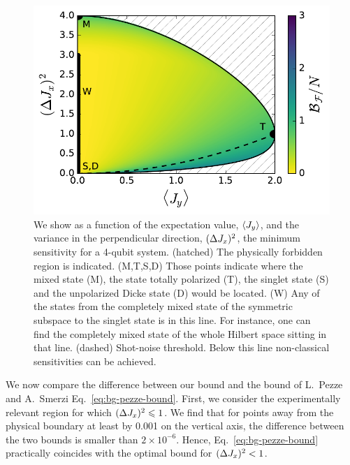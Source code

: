 \begin{figure}[htp]
  \centering
  \includegraphics[scale=.65]{img/LT_spsq2d_4.pdf}
  \caption[Solution for 4 particle on the paramenter region for spin-squeezed states.]{We show as a function of the expectation value, $\langle{J_y}\rangle$, and the variance in the perpendicular direction, $(\Delta J_x )^2$, the minimum sensitivity for a 4-qubit system.
  (hatched) The physically forbidden region is indicated. (M,T,S,D) Those points indicate where the mixed state (M), the state totally polarized (T), the singlet state (S) and the unpolarized Dicke state (D) would be located. (W) Any of the states from the completely mixed state of the symmetric subspace to the singlet state is in this line. For instance, one can  find the completely mixed state of the whole Hilbert space sitting in that line. (dashed) Shot-noise threshold. Below this line non-classical sensitivities can be achieved.}
  \label{fig:lt-spsq2d-4}
\end{figure}

We now compare the difference between our bound and the bound of L.~Pezze and A.~Smerzi Eq.~\eqref{eq:bg-pezze-bound}.
First, we consider the experimentally relevant region for which $(\Delta J_x )^2\leqslant 1$.
We find that for points away from the physical boundary at least by 0.001 on the vertical axis, the difference between the two bounds is smaller than $2\times10^{-6}$.
Hence, Eq.~\eqref{eq:bg-pezze-bound} practically coincides with the optimal bound for $(\Delta J_x )^2<1$.

